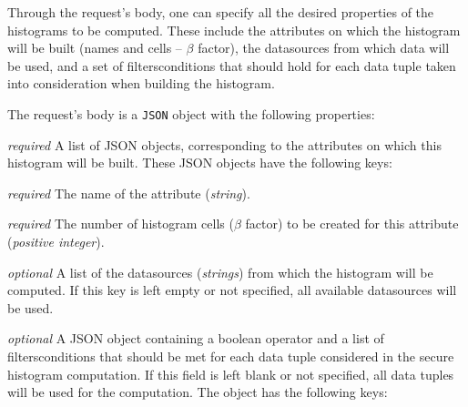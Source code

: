   \begin{description}[labelwidth=5em, leftmargin=\dimexpr\labelwidth+\labelsep\relax]
       \item[Request:] Through the request's body, one can specify all the desired properties of the histograms to be computed.
  These include the attributes on which the histogram will be built (names and cells -- $\beta$ factor), the datasources from which data will be used, and a set of filters\myslash conditions that should hold for each data tuple taken into consideration when building the histogram.


  The request's body is a \texttt{JSON} object with the following properties:

\begin{description}[labelwidth=6em, leftmargin=\dimexpr\labelwidth+\labelsep\relax]

    \item[\texttt{attributes}:] {\color{red}\textit{required}} A list of JSON objects, corresponding to the attributes on which this histogram will be built.
    These JSON objects have the following keys:

    \begin{description}[labelwidth=5em, leftmargin=\dimexpr\labelwidth+\labelsep\relax]
        \item[\texttt{name}:] {\color{red}\textit{required}} The name of the attribute (\textit{string}).

        \item[\texttt{cells}:] {\color{red}\textit{required}} The number of histogram cells ($\beta$ factor) to be created for this attribute (\textit{positive integer}).
    \end{description}

    \item[\texttt{datasources}:] {\color{blue}\textit{optional}} A list of the datasources (\textit{strings}) from which the histogram will be computed.
    If this key is left empty or not specified, all available datasources will be used.

    \item[\texttt{filters}:] {\color{blue}\textit{optional}} A JSON object containing a boolean operator and a list of filters\myslash conditions that should be met for each data tuple considered in the secure histogram computation.
    If this field is left blank or not specified, all data tuples will be used for the computation. The object has the following keys:


\end{description}
\end{description}
